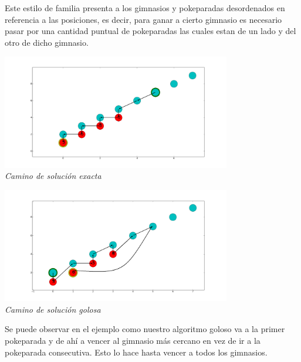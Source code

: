 Este estilo de familia presenta a los gimnasios y pokeparadas desordenados en referencia a las posiciones, es decir, para ganar a cierto gimnasio es necesario pasar por una cantidad puntual de pokeparadas las cuales estan de un lado y del otro de dicho gimnasio.

\vspace*{0.3cm} \vspace*{0.3cm}
  \begin{center}
 \includegraphics[width=0.75\textwidth]{./EJ2/caminosinorden1.png}
\\{\textit{Camino de solución exacta }}
   
  \end{center}
  \vspace*{0.3cm}

\vspace*{0.3cm} \vspace*{0.3cm}
  \begin{center}
    \includegraphics[width=0.75\textwidth]{./EJ2/caminosinorden.png}
\\{\textit{Camino de solución golosa }}
   
  \end{center}
  \vspace*{0.3cm}

Se puede observar en el ejemplo como nuestro algoritmo goloso va a la primer pokeparada y de ah\'i a vencer al gimnasio m\'as cercano en vez de ir a la pokeparada consecutiva. Esto lo hace hasta vencer a todos los gimnasios.

